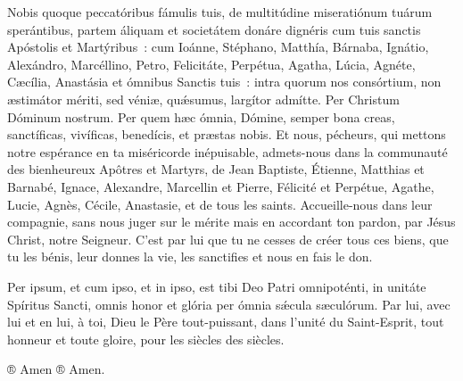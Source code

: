 \begin{paracol}{2}
\LigneParacol
{Nobis quoque peccatóribus fámulis tuis, de multitúdine miseratiónum tuárum sperántibus, partem áliquam et societátem donáre dignéris cum tuis sanctis Apóstolis et Martýribus~: cum Ioánne, Stéphano, Matthía, Bárnaba, Ignátio, Alexándro, Marcéllino, Petro, Felicitáte, Perpétua, Agatha, Lúcia, Agnéte, Cæcília, Anastásia et ómnibus Sanctis tuis~: intra quorum nos consórtium, non æstimátor mériti, sed véniæ, quǽsumus, largítor admítte. Per Christum Dóminum nostrum. Per quem hæc ómnia, Dómine, semper bona creas, sanctíficas, vivíficas, benedícis, et præstas nobis.}
{Et nous, pécheurs, qui mettons notre espérance en ta miséricorde inépuisable, admets-nous dans la communauté des bienheureux Apôtres et Martyrs, de Jean Baptiste, Étienne, Matthias et Barnabé, Ignace, Alexandre, Marcellin et Pierre, Félicité et Perpétue, Agathe, Lucie, Agnès, Cécile, Anastasie, et de tous les saints. Accueille-nous dans leur compagnie, sans nous juger sur le mérite mais en accordant ton pardon, par Jésus Christ, notre Seigneur. C'est par lui que tu ne cesses de créer tous ces biens, que tu les bénis, leur donnes la vie, les sanctifies et nous en fais le don.}

\LigneParacol
{Per ipsum, et cum ipso, et in ipso, est tibi Deo Patri omnipoténti, in unitáte Spíritus Sancti, omnis honor et glória per ómnia sǽcula sæculórum.}
{Par lui, avec lui et en lui, à toi, Dieu le Père tout-puissant, dans l'unité du Saint-Esprit, tout honneur et toute gloire, pour les siècles des siècles.}

\LigneParacol
{® Amen}
{® Amen.}

\end{paracol}
